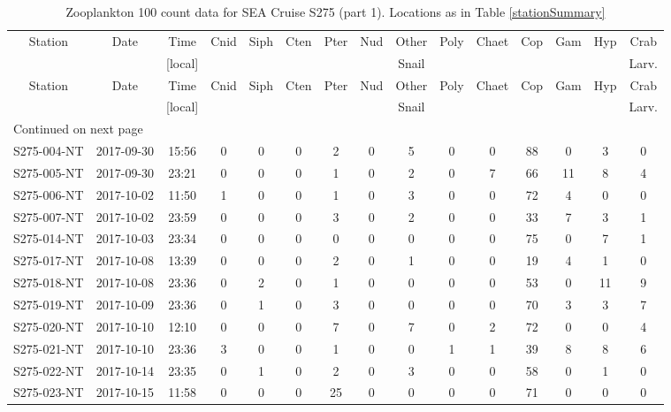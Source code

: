 \begin{longtable}{ccccccccccccccc}
\caption{\label{100count1} Zooplankton 100 count data for SEA Cruise S275 (part 1). Locations as in Table \ref{stationSummary}} \\ 
 Station & Date & Time & Cnid & Siph & Cten & Pter & Nud & Other & Poly & Chaet & Cop & Gam & Hyp & Crab \\ 
   &  & [local] &  &  &  &  &  & Snail &  &  &  &  &  & Larv. \\ 
\hline\n\endfirsthead
Station & Date & Time & Cnid & Siph & Cten & Pter & Nud & Other & Poly & Chaet & Cop & Gam & Hyp & Crab \\ 
 &  & [local] &  &  &  &  &  & Snail &  &  &  &  &  & Larv. \\ 
\hline
\endhead
\hline
\multicolumn{15}{l}{\footnotesize Continued on next page}
\endfoot
\endlastfoot
 \hline
S275-002-NT & 2017-09-29 & 23:48 & 0 & 0 & 0 & 3 & 0 & 0 & 0 & 0 & 87 & 3 & 2 & 1 \\ 
  S275-004-NT & 2017-09-30 & 15:56 & 0 & 0 & 0 & 2 & 0 & 5 & 0 & 0 & 88 & 0 & 3 & 0 \\ 
  S275-005-NT & 2017-09-30 & 23:21 & 0 & 0 & 0 & 1 & 0 & 2 & 0 & 7 & 66 & 11 & 8 & 4 \\ 
  S275-006-NT & 2017-10-02 & 11:50 & 1 & 0 & 0 & 1 & 0 & 3 & 0 & 0 & 72 & 4 & 0 & 0 \\ 
  S275-007-NT & 2017-10-02 & 23:59 & 0 & 0 & 0 & 3 & 0 & 2 & 0 & 0 & 33 & 7 & 3 & 1 \\ 
  S275-014-NT & 2017-10-03 & 23:34 & 0 & 0 & 0 & 0 & 0 & 0 & 0 & 0 & 75 & 0 & 7 & 1 \\ 
  S275-017-NT & 2017-10-08 & 13:39 & 0 & 0 & 0 & 2 & 0 & 1 & 0 & 0 & 19 & 4 & 1 & 0 \\ 
  S275-018-NT & 2017-10-08 & 23:36 & 0 & 2 & 0 & 1 & 0 & 0 & 0 & 0 & 53 & 0 & 11 & 9 \\ 
  S275-019-NT & 2017-10-09 & 23:36 & 0 & 1 & 0 & 3 & 0 & 0 & 0 & 0 & 70 & 3 & 3 & 7 \\ 
  S275-020-NT & 2017-10-10 & 12:10 & 0 & 0 & 0 & 7 & 0 & 7 & 0 & 2 & 72 & 0 & 0 & 4 \\ 
  S275-021-NT & 2017-10-10 & 23:36 & 3 & 0 & 0 & 1 & 0 & 0 & 1 & 1 & 39 & 8 & 8 & 6 \\ 
  S275-022-NT & 2017-10-14 & 23:35 & 0 & 1 & 0 & 2 & 0 & 3 & 0 & 0 & 58 & 0 & 1 & 0 \\ 
  S275-023-NT & 2017-10-15 & 11:58 & 0 & 0 & 0 & 25 & 0 & 0 & 0 & 0 & 71 & 0 & 0 & 0 \\ 

\end{longtable}
